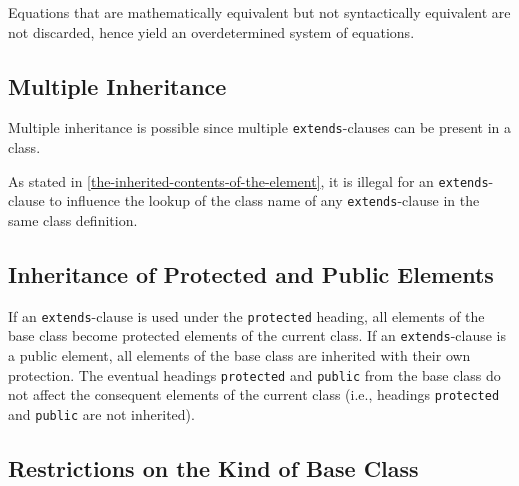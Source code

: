 \begin{nonnormative}
Equations that are mathematically equivalent but not syntactically equivalent are not discarded, hence yield an overdetermined system of equations.
\end{nonnormative}


\subsection{Multiple Inheritance}\label{multiple-inheritance}

Multiple inheritance is possible since multiple \lstinline!extends!-clauses can be present in a class.

\begin{nonnormative}
As stated in \cref{the-inherited-contents-of-the-element}, it is illegal for an \lstinline!extends!-clause to influence the lookup of the class name of any \lstinline!extends!-clause in the same class definition.
\end{nonnormative}


\subsection{Inheritance of Protected and Public Elements}\label{inheritance-of-protected-and-public-elements}

If an \lstinline!extends!-clause is used under the \lstinline!protected! heading, all elements of the base class become protected elements of the current class.
If an \lstinline!extends!-clause is a public element, all elements of the base class are inherited with their own protection.
The eventual headings \lstinline!protected! and \lstinline!public! from the base class do not affect the consequent elements of the current class (i.e., headings \lstinline!protected! and \lstinline!public! are not inherited).


\subsection{Restrictions on the Kind of Base Class}\label{restrictions-on-the-kind-of-base-class}

